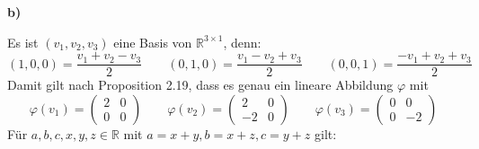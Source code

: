 \documentclass[a4paper,graphics,11pt]{article}
\begin{document}
\textbf{b)}

Es ist $(v_1, v_2, v_3)$ eine Basis von $\mathbb{R}^{3\times 1}$, denn:
$$
    (1,0,0) = \frac{v_1 + v_2 - v_3}{2}
    \qquad
    (0,1,0) = \frac{v_1 - v_2 + v_3}{2}
    \qquad
    (0,0,1) = \frac{-v_1 + v_2 + v_3}{2}
$$
Damit gilt nach Proposition 2.19, dass es genau ein lineare Abbildung $\varphi$ mit
$$
    \varphi(v_1) =
\begin{pmatrix}
    2 & 0\\
    0 & 0
\end{pmatrix}
\qquad
\varphi(v_2) =
\begin{pmatrix}
    2 & 0\\
    -2 & 0
\end{pmatrix}
\qquad
\varphi(v_3) =
\begin{pmatrix}
    0 & 0\\
    0 & -2
\end{pmatrix}
$$
Für $a,b,c,x,y,z \in \mathbb{R}$ mit $a = x+y, b = x+z, c = y+z$ gilt:
\end{document}
